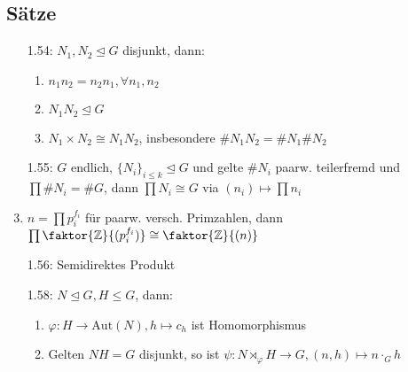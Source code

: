 \documentclass[twocolumn]{report}
\begin{document}
\subsection*{Sätze}
\begin{enumerate}[itemsep=0pt, topsep=0pt, parsep=0pt, partopsep=0pt, leftmargin=*]
    \item[1.54:] $N_1, N_2 \trianglelefteq G$ disjunkt, dann:
        \begin{enumerate}[itemsep=0pt, topsep=0pt, parsep=0pt, partopsep=0pt, leftmargin=*]
            \item $n_1n_2 = n_2n_1, \forall n_1, n_2$
            \item $N_1N_2 \trianglelefteq G$
            \item $N_1 \times N_2 \cong N_1N_2$, insbesondere $\#N_1N_2 = \#N_1\#N_2$
        \end{enumerate}
    \item[1.55:] $G$ endlich, $\{N_i\}_{i \leq k} \trianglelefteq G$ und gelte $\#N_i$ paarw. teilerfremd und $\prod \#N_i = \#G$, dann $\prod N_i \cong G$ via $(n_i) \mapsto \prod n_i$
    \item $n = \prod p_i^{f_i}$ für paarw. versch. Primzahlen, dann $\prod \faktor{\mathbb{Z}}{(p_i^{f_i})} \cong \faktor{\mathbb{Z}}{(n)}$
    \item[1.56:] Semidirektes Produkt
    \item[1.58:] $N \trianglelefteq G, H \leq G$, dann:
        \begin{enumerate}[itemsep=0pt, topsep=0pt, parsep=0pt, partopsep=0pt, leftmargin=*]
            \item $\varphi: H \to \text{Aut}(N), h \mapsto c_h$ ist Homomorphismus
            \item Gelten $NH = G$ disjunkt, so ist $\psi: N \rtimes_{\varphi} H \to G, (n,h) \mapsto n \cdot_G h$
        \end{enumerate}
\end{enumerate}
\end{document}
